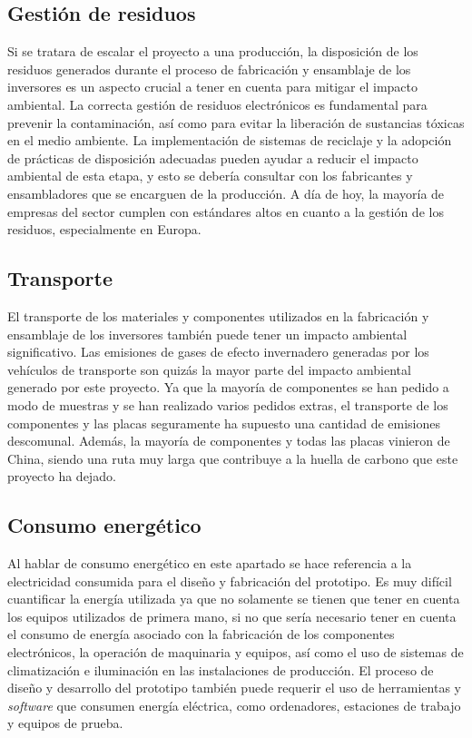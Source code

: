 \subsection{Gestión de residuos}

Si se tratara de escalar el proyecto a una producción, la disposición de los residuos generados durante el proceso de fabricación y ensamblaje de los inversores es un aspecto crucial a tener en cuenta para mitigar el impacto ambiental. La correcta gestión de residuos electrónicos es fundamental para prevenir la contaminación, así como para evitar la liberación de sustancias tóxicas en el medio ambiente. La implementación de sistemas de reciclaje y la adopción de prácticas de disposición adecuadas pueden ayudar a reducir el impacto ambiental de esta etapa, y esto se debería consultar con los fabricantes y ensambladores que se encarguen de la producción. A día de hoy, la mayoría de empresas del sector cumplen con estándares altos en cuanto a la gestión de los residuos, especialmente en Europa.

\subsection{Transporte}

El transporte de los materiales y componentes utilizados en la fabricación y ensamblaje de los inversores también puede tener un impacto ambiental significativo. Las emisiones de gases de efecto invernadero generadas por los vehículos de transporte son quizás la mayor parte del impacto ambiental generado por este proyecto. Ya que la mayoría de componentes se han pedido a modo de muestras y se han realizado varios pedidos extras, el transporte de los componentes y las placas seguramente ha supuesto una cantidad de emisiones descomunal. Además, la mayoría de componentes y todas las placas vinieron de China, siendo una ruta muy larga que contribuye a la huella de carbono que este proyecto ha dejado.

\subsection{Consumo energético}

Al hablar de consumo energético en este apartado se hace referencia a la electricidad consumida para el diseño y fabricación del prototipo. Es muy difícil cuantificar la energía utilizada ya que no solamente se tienen que tener en cuenta los equipos utilizados de primera mano, si no que sería necesario tener en cuenta el consumo de energía asociado con la fabricación de los componentes electrónicos, la operación de maquinaria y equipos, así como el uso de sistemas de climatización e iluminación en las instalaciones de producción. El proceso de diseño y desarrollo del prototipo también puede requerir el uso de herramientas y \textit{software} que consumen energía eléctrica, como ordenadores, estaciones de trabajo y equipos de prueba.


